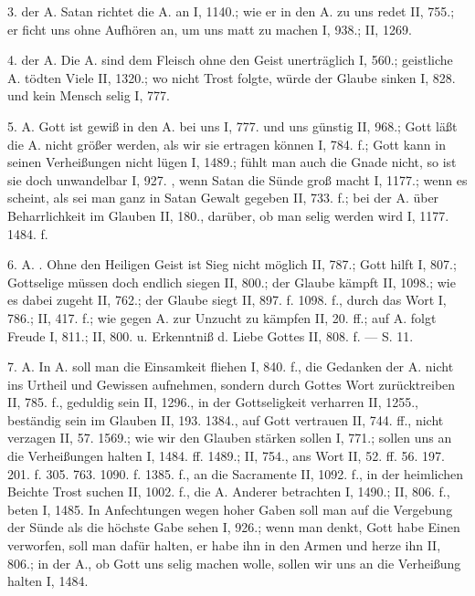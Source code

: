 3.  der A. Satan richtet die A. an I, 1140.; wie er in den A. zu uns redet II, 755.; er ficht uns ohne Aufhören an, um uns matt zu machen I, 938.; II, 1269.

4.  der A. Die A. sind dem Fleisch ohne den Geist unerträglich I, 560.; geistliche A. tödten Viele II, 1320.; wo nicht Trost folgte, würde der Glaube sinken I, 828. und kein Mensch selig I, 777.

5.  A. Gott ist gewiß in den A. bei uns I, 777. und uns günstig II, 968.; Gott läßt die A. nicht größer werden, als wir sie ertragen können I, 784. f.; Gott kann in seinen Verheißungen nicht lügen I, 1489.; fühlt man auch die Gnade nicht, so ist sie doch unwandelbar I, 927. , wenn Satan die Sünde groß macht I, 1177.; wenn es scheint, als sei man ganz in Satan Gewalt gegeben II, 733. f.; bei der A. über Beharrlichkeit im Glauben II, 180., darüber, ob man selig werden wird I, 1177. 1484. f.

6.  A. . Ohne den Heiligen Geist ist Sieg nicht möglich II, 787.; Gott hilft I, 807.; Gottselige müssen doch endlich siegen II, 800.; der Glaube kämpft II, 1098.; wie es dabei zugeht II, 762.; der Glaube siegt II, 897. f. 1098. f., durch das Wort I, 786.; II, 417. f.; wie gegen A. zur Unzucht zu kämpfen II, 20. ff.; auf A. folgt Freude I, 811.; II, 800. u. Erkenntniß d. Liebe Gottes II, 808. f. — S.  11.

7.  A. In A. soll man die Einsamkeit fliehen I, 840. f., die Gedanken der A. nicht ins Urtheil und Gewissen aufnehmen, sondern durch Gottes Wort zurücktreiben II, 785. f., geduldig sein II, 1296., in der Gottseligkeit verharren II, 1255., beständig sein im Glauben II, 193. 1384., auf Gott vertrauen II, 744. ff., nicht verzagen II, 57. 1569.; wie wir den Glauben stärken sollen I, 771.; sollen uns an die Verheißungen halten I, 1484. ff. 1489.; II, 754., ans Wort II, 52. ff. 56. 197. 201. f. 305. 763. 1090. f. 1385. f., an die Sacramente II, 1092. f., in der heimlichen Beichte Trost suchen II, 1002. f., die A. Anderer betrachten I, 1490.; II, 806. f., beten I, 1485. In Anfechtungen wegen hoher Gaben soll man auf die Vergebung der Sünde als die höchste Gabe sehen I, 926.; wenn man denkt, Gott habe Einen verworfen, soll man dafür halten, er habe ihn in den Armen und herze ihn II, 806.; in der A., ob Gott uns selig machen wolle, sollen wir uns an die Verheißung halten I, 1484.

